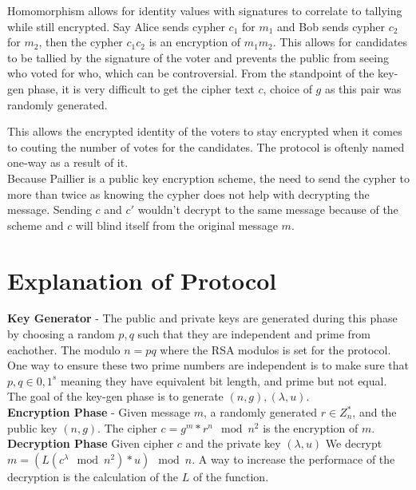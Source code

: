 \documentclass[12pt]{amsart}
\begin{document}
\indent Homomorphism allows for identity values with signatures to correlate to
tallying while still encrypted. Say Alice sends cypher $c_{1}$ for $m_{1}$ and
Bob sends cypher $c_{2}$ for $m_{2}$, then the cypher $c_{1}c_{2}$ is an encryption
of $m_{1}m_{2}$. This allows for candidates to be tallied by the signature of 
the voter and prevents the public from seeing who
voted for who, which can be controversial. From the standpoint of the key-gen
phase, it is very difficult to get the cipher text $c$, choice of $g$ as this
pair was randomly generated.

\indent This allows the encrypted identity of the voters to stay encrypted when it comes
to couting the number of votes for the candidates. The protocol is oftenly named
one-way as a result of it.\\

\indent Because Paillier is a public key encryption scheme, the need to send the
cypher to more than twice as knowing the cypher does not help with decrypting
the message. Sending $c$ and $c'$ wouldn't decrypt to the same message because of
the scheme and $c$ will blind itself from the original message $m$.

\section*{\textbf{Explanation of Protocol}}

\textbf{Key Generator} - The public and private keys are generated during this
phase by choosing a random $p,q$ such that they are independent and prime from
eachother. The modulo $n = pq$ where the RSA modulos is set for the protocol. 
One way to ensure these two prime numbers are independent is to make sure that
$p,q \in {0,1}^{s}$ meaning they have equivalent bit length, and prime but not
equal. The goal of the key-gen phase is to generate $(n,g), (\lambda, u)$. \\

\textbf{Encryption Phase} - Given message $m$, a randomly generated $r \in
Z_{n}^{*}$, and the public key $(n,g)$. The cipher $c = g^{m} * r^{n} \mod n^2$
is the encryption of $m$. \\

\textbf{Decryption Phase} Given cipher $c$ and the private key $(\lambda, u)$
We decrypt $m = (L(c^{\lambda} \mod n^2) * u) \mod n$. A way to increase the
performace of the decryption is the calculation of the $L$ of the function. \\
\end{document}
